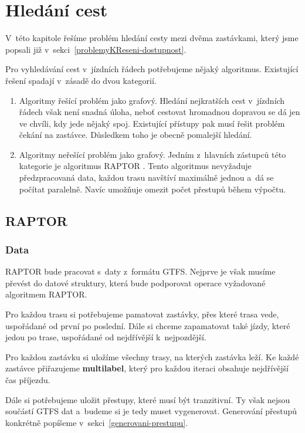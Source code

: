 \chapter{Hledání cest}\label{kapitola-2}

V~této kapitole řešíme problém hledání cesty mezi dvěma zastávkami, který jsme popsali již v~sekci~\ref{problemyKReseni-dostupnost}.

Pro vyhledávání cest v~jízdních řádech potřebujeme nějaký algoritmus. Existující řešení spadají v~zásadě do dvou kategorií.

\begin{enumerate}
    \item Algoritmy řešící problém jako grafový. Hledání nejkratších cest v~jízdních řádech však není snadná úloha, neboť cestovat hromadnou dopravou se dá jen ve chvíli, kdy jede nějaký spoj. Existující přístupy pak musí řešit problém čekání na zastávce. Důsledkem toho je obecně pomalejší hledání.

    \item Algoritmy neřešící problém jako grafový. Jedním z~hlavních zástupců této kategorie je algoritmus RAPTOR \citet{raptor}. Tento algoritmus nevyžaduje předzpracovaná data, každou trasu navštíví maximálně jednou a~dá se počítat paralelně. Navíc umožňuje omezit počet přestupů během výpočtu.
\end{enumerate}

\section{RAPTOR}

\subsection{Data}\label{raptor-data}

RAPTOR bude pracovat s~daty z~formátu GTFS. Nejprve je však musíme převést do datové struktury, která bude podporovat operace vyžadované algoritmem RAPTOR.

Pro každou trasu si potřebujeme pamatovat zastávky, přes které trasa vede, uspořádané od první po poslední. Dále si chceme zapamatovat také jízdy, které jedou po trase, uspořádané od nejdřívější k~nejpozdější.

Pro každou zastávku si uložíme všechny trasy, na kterých zastávka leží. Ke každé zastávce přiřazujeme \textbf{multilabel}, který pro každou iteraci obsahuje nejdřívější čas příjezdu.

Dále si potřebujeme uložit přestupy, které musí být tranzitivní. Ty však nejsou součástí GTFS dat a~budeme si je tedy muset vygenerovat. Generování přestupů konkrétně popíšeme v~sekci~\ref{generovani-prestupu}.

